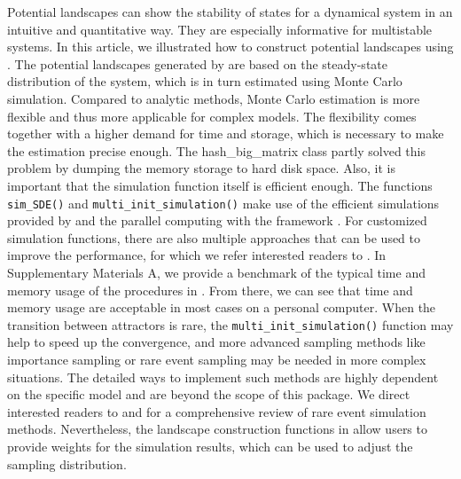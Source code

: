 Potential landscapes can show the stability of states for a dynamical system in an intuitive and quantitative way. They are especially informative for multistable systems. In this article, we illustrated how to construct potential landscapes using . The potential landscapes generated by  are based on the steady-state distribution of the system, which is in turn estimated using Monte Carlo simulation. Compared to analytic methods, Monte Carlo estimation is more flexible and thus more applicable for complex models. The flexibility comes together with a higher demand for time and storage, which is necessary to make the estimation precise enough. The hash\_big\_matrix class partly solved this problem by dumping the memory storage to hard disk space. Also, it is important that the simulation function itself is efficient enough. The functions \texttt{sim\_SDE()} and \texttt{multi\_init\_simulation()} make use of the efficient simulations provided by  \citep{GuidoumBoukhetalaPerformingParallelMonte2020} and the parallel computing with the  framework \citep{RJ-2021-048}. For customized simulation functions, there are also multiple approaches that can be used to improve the performance, for which we refer interested readers to \citet{WickhamImprovingPerformance2019a}. In Supplementary Materials A, we provide a benchmark of the typical time and memory usage of the procedures in . From there, we can see that time and memory usage are acceptable in most cases on a personal computer. When the transition between attractors is rare, the \texttt{multi\_init\_simulation()} function may help to speed up the convergence, and more advanced sampling methods like importance sampling or rare event sampling may be needed in more complex situations. The detailed ways to implement such methods are highly dependent on the specific model and are beyond the scope of this package. We direct interested readers to \citet{RubinoTuffinRareEventSimulation2009} and \citet{KloekvanDijkBayesianEstimatesEquation1978} for a comprehensive review of rare event simulation methods. Nevertheless, the landscape construction functions in  allow users to provide weights for the simulation results, which can be used to adjust the sampling distribution.

